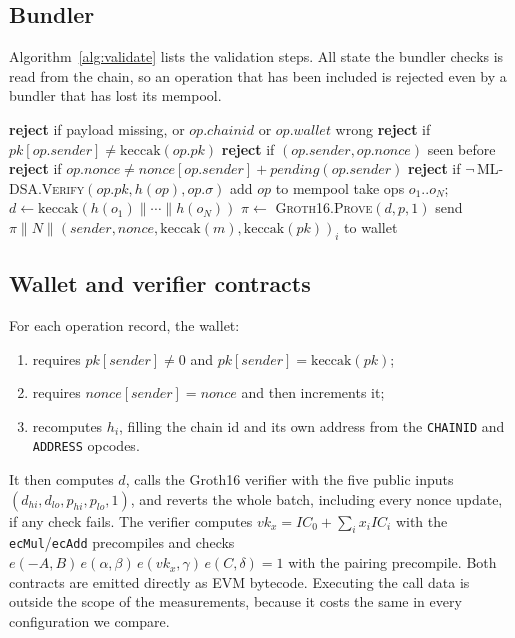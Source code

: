 \documentclass[conference]{IEEEtran}
\begin{document}
\subsection{Bundler}
Algorithm~\ref{alg:validate} lists the validation steps. All state the bundler checks is read from the chain, so an operation that has been included is rejected even by a bundler that has lost its mempool.

\begin{algorithm}[t]
\caption{Bundler validation and batching}\label{alg:validate}
\begin{algorithmic}[1]
\State \textbf{reject} if payload missing, or $op.chainid$ or $op.wallet$ wrong
\State \textbf{reject} if $\mathit{pk}[op.sender] \neq \mathrm{keccak}(op.pk)$ 
\State \textbf{reject} if $(op.sender, op.nonce)$ seen before
\State \textbf{reject} if $op.nonce \neq \mathit{nonce}[op.sender] + \mathit{pending}(op.sender)$
\State \textbf{reject} if $\neg$\,\textsc{ML-DSA.Verify}$(op.pk, h(op), op.\sigma)$ 
\State add $op$ to mempool
\EndFunction
{}
\State take ops $o_1..o_N$; $d \gets \mathrm{keccak}(h(o_1)\|\cdots\|h(o_N))$
\State $\pi \gets$ \textsc{Groth16.Prove}$(d, p, 1)$
\State send $\pi \| N \| (sender, nonce, \mathrm{keccak}(m), \mathrm{keccak}(pk))_{i}$ to wallet
\EndFunction
\end{algorithmic}
\end{algorithm}

\subsection{Wallet and verifier contracts}
For each operation record, the wallet:
\begin{enumerate}
\item requires $\mathit{pk}[sender]\neq 0$ and $\mathit{pk}[sender]=\mathrm{keccak}(pk)$;
\item requires $\mathit{nonce}[sender]=nonce$ and then increments it;
\item recomputes $h_i$, filling the chain id and its own address from the \texttt{CHAINID} and \texttt{ADDRESS} opcodes.
\end{enumerate}
It then computes $d$, calls the Groth16 verifier with the five public inputs $(d_{hi}, d_{lo}, p_{hi}, p_{lo}, 1)$, and reverts the whole batch, including every nonce update, if any check fails. The verifier computes $vk_x=IC_0+\sum_i x_i IC_i$ with the \texttt{ecMul}/\texttt{ecAdd} precompiles and checks $e(-A,B)\,e(\alpha,\beta)\,e(vk_x,\gamma)\,e(C,\delta)=1$ with the pairing precompile. Both contracts are emitted directly as EVM bytecode. Executing the call data is outside the scope of the measurements, because it costs the same in every configuration we compare.
\end{document}
